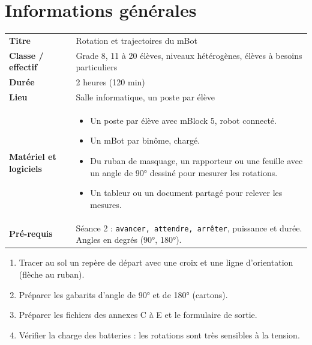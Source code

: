 \documentclass[11pt,a4paper]{article}
\begin{document}

\section{Informations générales}
\begin{tabularx}{\linewidth}{>{\bfseries}p{3.6cm}Y}
\toprule
Titre & Rotation et trajectoires du mBot\\
Classe / effectif & Grade 8, 11 à 20 élèves, niveaux hétérogènes, élèves à besoins particuliers\\
Durée & 2 heures (120 min)\\
Lieu & Salle informatique, un poste par élève\\
Matériel et logiciels &
\begin{itemize}
 \item Un poste par élève avec mBlock 5, robot connecté.
 \item Un mBot par binôme, chargé.
 \item Du ruban de masquage, un rapporteur ou une feuille avec un angle de 90° dessiné pour mesurer les rotations.
 \item Un tableur ou un document partagé pour relever les mesures.
\end{itemize}\\
Pré-requis &
Séance 2 : \texttt{avancer, attendre, arrêter}, puissance et durée. Angles en degrés (90°, 180°).\\
\bottomrule
\end{tabularx}

\begin{astuce}
\begin{enumerate}
 \item Tracer au sol un repère de départ avec une croix et une ligne d'orientation (flèche au ruban).
 \item Préparer les gabarits d'angle de 90° et de 180° (cartons).
 \item Préparer les fichiers des annexes C à E et le formulaire de sortie.
 \item Vérifier la charge des batteries : les rotations sont très sensibles à la tension.
\end{enumerate}
\end{astuce}

\end{document}
